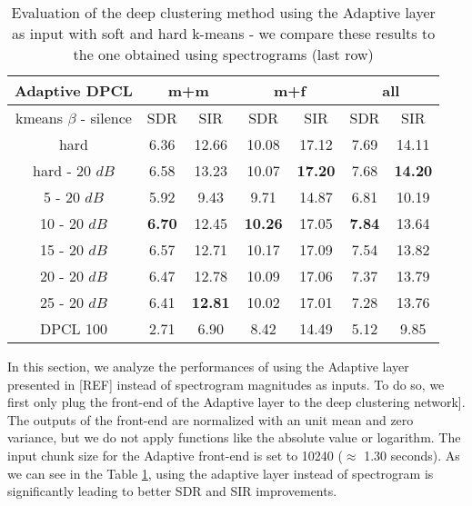 \documentclass[master,final,11pt]{iscs-thesis}
\begin{document}
\begin{table}[h]
\centering
\begin{tabular}{c|c|c|c|c|c|c}
Adaptive DPCL & \multicolumn{2}{c|}{m+m} & \multicolumn{2}{c|}{m+f} & \multicolumn{2}{c}{all} \\ 
\hline 
kmeans $\beta$ - silence & SDR & SIR & SDR & SIR & SDR & SIR \\ 
\hline 
hard & 6.36 & 12.66 & 10.08 & 17.12 & 7.69 & 14.11 \\ 
hard - 20 $dB$ & 6.58 & 13.23 & 10.07 & \textbf{17.20} & 7.68 & \textbf{14.20} \\ 
\hline 
\hline 
5 - 20 $dB$ & 5.92 & 9.43 & 9.71 & 14.87 & 6.81 & 10.19 \\ 
10 - 20 $dB$ & \textbf{6.70} & 12.45 & \textbf{10.26} & 17.05 & \textbf{7.84} & 13.64 \\ 
15 - 20 $dB$ & 6.57 & 12.71 & 10.17 & 17.09 & 7.54 & 13.82 \\ 
20 - 20 $dB$ & 6.47 & 12.78 & 10.09 & 17.06 & 7.37 & 13.79 \\ 
25 - 20 $dB$ & 6.41 & \textbf{12.81} & 10.02 & 17.01 & 7.28 & 13.76 \\ 
\hline 
\hline 
DPCL 100 & 2.71 & 6.90 & 8.42 & 14.49 & 5.12 & 9.85 \\ 
\end{tabular}
\captionsetup{justification=centering}
\caption{Evaluation of the deep clustering method using the Adaptive layer as input with soft and hard k-means - we compare these results to the one obtained using spectrograms  (last row)}
\label{table:AdaptDPCL100}
\end{table}


In this section, we analyze the performances of using the Adaptive layer presented in [REF] instead of spectrogram magnitudes as inputs.
To do so, we first only plug the front-end of the Adaptive layer to the deep clustering network]. The outputs of the front-end are normalized with an unit mean and zero variance, 
but we do not apply functions like the absolute value or logarithm.
The input chunk size for the Adaptive front-end is set to 10240 ($\approx$ 1.30 seconds). 
As we can see in the Table \ref{table:AdaptDPCL100}, using the adaptive layer instead of spectrogram is significantly leading to better SDR and SIR improvements.
\end{document}
